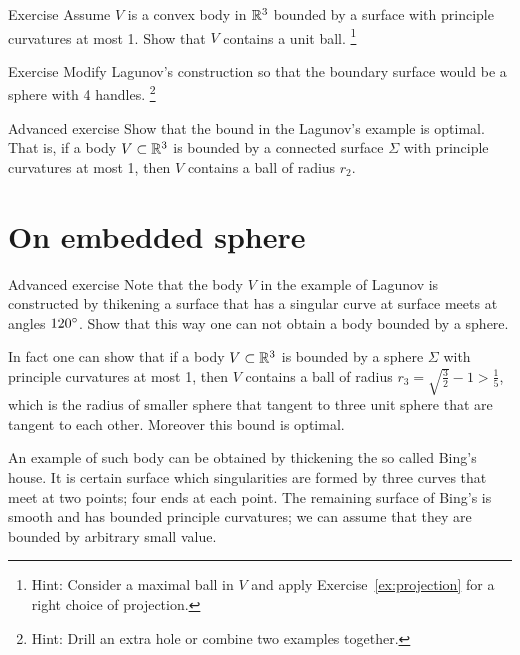\begin{thm}{Exercise}\label{ex:convex-lagunov}
Assume $V$ is a convex body in $\mathbb{R}^3$ bounded by a surface with principle curvatures at most 1.
Show that $V$ contains a unit ball.%
\footnote{Hint: Consider a maximal ball in $V$ and apply Exercise~\ref{ex:projection} for a right choice of projection.}
\end{thm}





\begin{thm}{Exercise}
Modify Lagunov's construction so that the boundary surface would be a sphere with 4 handles.%
\footnote{Hint: Drill an extra hole or combine two examples together.}
\end{thm}



\begin{thm}{Advanced exercise}
Show that the bound in the Lagunov's example is optimal.
That is, if a body $V\subset \mathbb{R}^3$ is bounded by a connected surface  $\Sigma$ with principle curvatures at most 1, then $V$ contains a ball of radius $r_2$.
\end{thm}

\section{On embedded sphere}


\begin{thm}{Advanced exercise}
Note that the body $V$ in the example of Lagunov is constructed by thikening a surface that has a singular curve at surface meets at angles $120\degree$.
Show that this way one can not obtain a body bounded by a sphere.
\end{thm}

In fact one can show that if a body $V\subset \mathbb{R}^3$ is bounded by a sphere $\Sigma$ with principle curvatures at most 1, then $V$ contains a ball of radius $r_3=\sqrt{\tfrac32}-1>\tfrac15$,
which is the radius of smaller sphere that tangent to three unit sphere that are tangent to each other.
Moreover this bound is optimal.

An example of such body can be obtained by thickening the so called Bing's house.
It is certain surface which singularities are formed by three curves that meet at two points;
four ends at each point.
The remaining surface of Bing's is smooth and has bounded principle curvatures;
we can assume that they are bounded by arbitrary small value.

